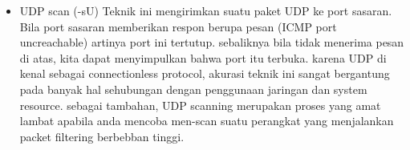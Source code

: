 \begin{itemize}
   \item UDP scan (-sU)
         Teknik ini mengirimkan suatu paket UDP ke port sasaran. Bila port sasaran memberikan respon berupa pesan (ICMP port uncreachable) artinya port ini tertutup. sebaliknya bila tidak menerima pesan di atas, kita dapat menyimpulkan bahwa port itu terbuka. karena UDP di kenal sebagai connectionless protocol, akurasi teknik ini sangat bergantung pada banyak hal sehubungan dengan penggunaan jaringan dan system resource. sebagai tambahan, UDP scanning merupakan proses yang amat lambat apabila anda mencoba men-scan suatu perangkat yang menjalankan packet filtering berbebban tinggi.
 \end{itemize} 
 
 